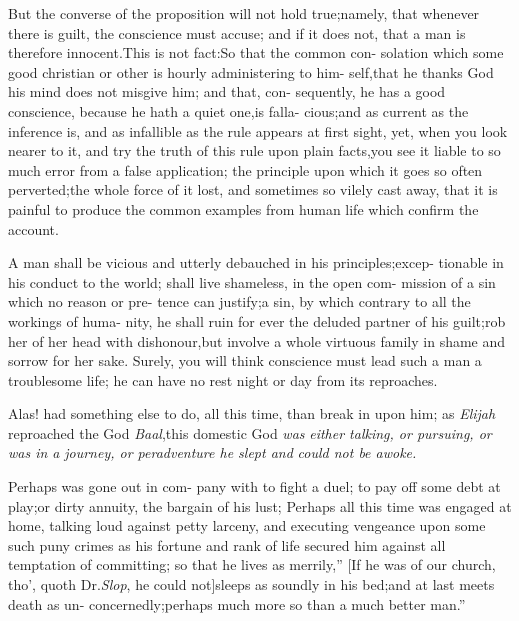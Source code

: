 \documentclass{article}
\begin{document}
\lqq But the converse of the proposition\break
\lqq will not hold true;\tsh namely, that\break
\lqq whenever there is guilt, the conscience\break
\lqq must accuse; and if it does not, that\break
\lqq a man is therefore innocent.\tsk This is\break
\lqq not fact:\tsk So that the common con-\break
\lqq solation which some good christian or\break
\lqq other is hourly administering to him-\break
\lqq self,\tsk that he thanks God his mind\break
\lqq does not misgive him; and that, con-
\lqq sequently, he has a good conscience,\break
\lqq because he hath a quiet one,\tsk is falla-\break
\lqq cious;\tsk and as current as the inference\break
\lqq is, and as infallible as the rule appears\break
\lqq at first sight, yet, when you look nearer\break
\lqq to it, and try the truth of this rule\break
\lqq upon plain facts,\tsk you see it liable to\break
\lqq so much error from a false application;\break
\lqq \tsk the principle upon which it goes so\break
\lqq often perverted;\tsk the whole force of\break
\lqq it lost, and sometimes so vilely cast\break
\lqq away, that it is painful to produce the\break
\lqq common examples from human life\break
\lqq which confirm the account.

\lqq A man shall be vicious and utterly\break
\lqq debauched in his principles;\tsk excep-\break
\lqq tionable in his conduct to the world;\break
\lqq shall live shameless, in the open com-\break
\lqq mission of a sin which no reason or pre-\break
\lqq tence can justify;\tsk a sin, by which
\lqq contrary to all the workings of huma-\break
\lqq nity, he shall ruin for ever the deluded\break
\lqq partner of his guilt;\tsk rob her of her\break
{}\break
\lqq head with dishonour,\tsk but involve a\break
\lqq whole virtuous family in shame and\break
\lqq sorrow for her sake. Surely, you will\break
\lqq think conscience must lead such a man\break
\lqq a troublesome life; he can have no\break
\lqq rest night or day from its reproaches.

\lqq Alas!  had something\break
\lqq else to do, all this time, than break in\break
\lqq upon him; as \textit{Elijah} reproached the\break
\lqq God \textit{Baal},\tsh this domestic God \textit{was}\break
\lqq \textit{either talking, or pursuing, or was in a}\break
\lqq \textit{journey, or peradventure he slept and}\break
\lqq \textit{could not be awoke.}

\lqq Perhaps  was gone out in com-\break
\lqq pany with  to fight a duel;
\lqq to pay off some debt at play;\tsh or\break
\lqq dirty annuity, the bargain of his lust;\break
\lqq Perhaps  all this time was\break
\lqq engaged at home, talking loud against\break
\lqq petty larceny, and executing vengeance\break
\lqq upon some such puny crimes as his\break
\lqq fortune and rank of life secured him\break
\lqq against all temptation of committing;\break
\lqq so that he lives as merrily,” [If he was\break
of our church, tho’, quoth Dr.\@ \textit{Slop}, he\break
could not]\tsk \lqq sleeps as soundly in his\break
\lqq bed;\tsk and at last meets death as un-\break
\lqq concernedly;\tsk perhaps much more so\break
\lqq than a much better man.”
\end{document}
